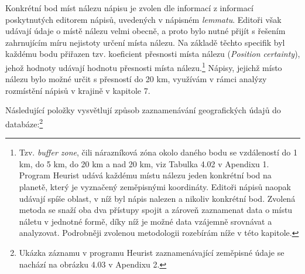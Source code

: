 Konkrétní bod míst nálezu nápisu je zvolen dle informací z informací poskytnutých editorem nápisů, uvedených v nápisném {\em lemmatu}. Editoři však udávají údaje o místě nálezu velmi obecně, a proto bylo nutné přijít s řešením zahrnujícím míru nejistoty určení místa nálezu. Na základě těchto specifik byl každému bodu přiřazen tzv. koeficient přesnosti místa nálezu ({\em Position certainty}), jehož hodnoty udávají hodnotu přesnosti místa nálezu.\footnote{Tzv. {\em buffer zone}, čili nárazníková zóna okolo daného bodu se vzdáleností do 1 km, do 5 km, do 20 km a nad 20 km, viz Tabulka 4.02 v Apendixu 1. Program Heurist udává každému místu nálezu jeden konkrétní bod na planetě, který je vyznačený zeměpisnými koordináty. Editoři nápisů naopak udávají spíše oblast, v níž byl nápis nalezen a nikoliv konkrétní bod. Zvolená metoda se snaží oba dva přístupy spojit a zároveň zaznamenat data o místu náletu v jednotné formě, díky níž je možné data vzájemně srovnávat a analyzovat. Podrobněji zvolenou metodologii rozebírám níže v této kapitole.} Nápisy, jejichž místo nálezu bylo možné určit s přesností do 20 km, využívám v rámci analýzy rozmístění nápisů v krajině v kapitole 7.

Následující položky vysvětlují způsob zaznamenávání geografických údajů do databáze:\footnote{Ukázka záznamu v programu Heurist zaznamenávající zeměpisné údaje se nachází na obrázku 4.03 v Apendixu 2.}

